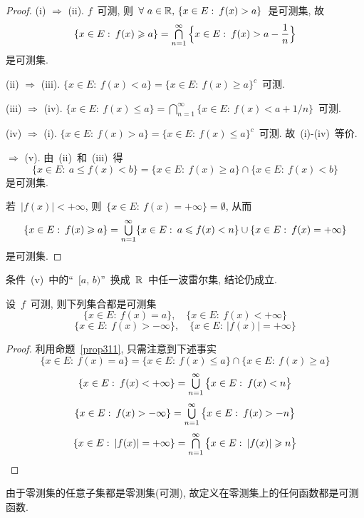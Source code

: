 \begin{proof}
(i) $\Rightarrow$ (ii). $f$~可测, 则~$\forall~a \in \mathbb{R}, \, \{x \in E: \: f(x) > a\}$~是可测集, 故
\[
\{x \in E: \: f(x) \geqslant a\} = \mathop{\textstyle{\bigcap}}_{n=1}^\infty \Big\{x \in E: \: f(x) > a - \frac{1}{n} \Big\}
\]
是可测集.

(ii) $\Rightarrow$ (iii). $\{x \in E: \: f(x) < a\} = \{x \in E: \: f(x) \geqslant a\}^c$~可测.

(iii) $\Rightarrow$ (iv). $\{x \in E: \: f(x) \leqslant a\} = \bigcap\limits_{n=1}^\infty \{x \in E: \: f(x) < a + 1/n\}$~可测.

(iv) $\Rightarrow$ (i).  $\{x \in E: \: f(x) > a\} = \{x \in E: \: f(x) \leqslant a\}^c$~可测. 故~(i)-(iv)~等价.

$\Rightarrow$ (v). 由~(ii)~和~(iii)~得
\[
\{x \in E: \: a \leqslant f(x) < b\} = \{x \in E: \: f(x) \geqslant a\} \cap \{x \in E: \: f(x) < b\}
\]
是可测集.

若~$|f(x)| < +\infty$, 则~$\{x \in E: \: f(x) = + \infty\} = \emptyset$, 从而
\[
\{x \in E: \: f(x) \geqslant a\} = \mathop{\textstyle{\bigcup}}\limits_{n=1}^\infty \{x \in E: \: a \leqslant f(x) < n\} \cup \{x \in E: \: f(x) = + \infty\}
\]
是可测集.
\end{proof}

\begin{remark}
条件~(v)~中的``~$[a,\,b)$''~换成~$\mathbb{R}$~中任一波雷尔集, 结论仍成立.
\end{remark}

\begin{proposition}
设~$f$~可测, 则下列集合都是可测集
\[
\{x \in E: \: f(x) = a\}, \quad \{x \in E: \: f(x) < +\infty \}
\]
\[
\{x \in E: \: f(x) > -\infty \}, \quad \{x \in E: \: |f(x)| = +\infty \}
\]
\end{proposition}

\begin{proof}
利用命题~\ref{prop311}, 只需注意到下述事实
\[
\{x \in E: \: f(x) = a\} = \{x \in E: \: f(x) \leqslant a\} \cap \{x \in E: \: f(x) \geqslant a\}
\]
\[
\{x \in E: \: f(x) < +\infty\} = \mathop{\textstyle{\bigcup}}_{n=1}^\infty \big\{x \in E: \: f(x) < n\big\}
\]
\[
\{x \in E: \: f(x) > -\infty\} = \mathop{\textstyle{\bigcup}}_{n=1}^\infty \big\{x \in E: \: f(x) > -n \big\}
\]
\[
\{x \in E: \: |f(x)| = +\infty\} = \mathop{\textstyle{\bigcap}}_{n=1}^\infty \big\{x \in E: \: |f(x)| \geqslant n\big\}
\]
\end{proof}

\begin{example} \label{ex311}
由于零测集的任意子集都是零测集(可测), 故定义在零测集上的任何函数都是可测函数.
\end{example}

